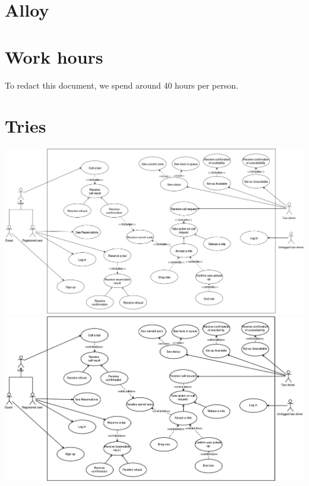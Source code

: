 \begin{appendices}
\chapter{Alloy}


\chapter{Work hours}
To redact this document, we spend around 40 hours per person.

\chapter{Tries}
\begin{landscape}
    \includegraphics[width=850pt, keepaspectratio]{files/index.png}
    \label{fig:PropProf}
	\includegraphics{files/use_case.pdf}
\end{landscape}
    

\label{fig:PropProf}


\end{appendices}

